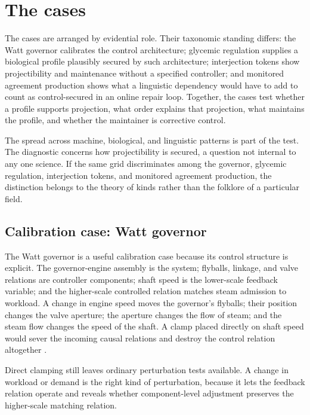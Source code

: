 \documentclass[12pt]{article}
\begin{document}
\section{The cases}

The cases are arranged by evidential role. Their taxonomic standing differs: the
Watt governor calibrates the control architecture; glycemic regulation supplies a
biological profile plausibly secured by such architecture; interjection tokens show
projectibility and maintenance without a specified controller; and monitored
agreement production shows what a linguistic dependency would have to add to count
as control-secured in an online repair loop. Together, the cases test whether a profile
supports projection, what order explains that projection, what maintains the
profile, and whether the maintainer is corrective control.

The spread across machine, biological, and linguistic patterns is part of the
test. The diagnostic concerns how projectibility is secured, a question not
internal to any one science. If the same grid discriminates among the governor,
glycemic regulation, interjection tokens, and monitored agreement production, the
distinction belongs to the theory of kinds rather than the folklore of a
particular field.

\subsection{Calibration case: Watt governor}

The Watt governor is a useful calibration case because its control structure is
explicit. The governor-engine assembly is the system; flyballs, linkage, and valve
relations are controller components; shaft speed is the lower-scale feedback
variable; and the higher-scale controlled relation matches steam admission to
workload. A change in engine speed moves the governor's flyballs; their position
changes the valve aperture; the aperture changes the flow of steam; and the steam
flow changes the speed of the shaft. A clamp placed directly on shaft speed would
sever the incoming causal relations and destroy the control relation altogether
\citep{weinberger2026HomeostasisCausalControl}.

Direct clamping still leaves ordinary perturbation tests available. A change in
workload or demand is the right kind of perturbation, because it lets the feedback
relation operate and reveals whether component-level adjustment preserves the
higher-scale matching relation.
\end{document}
